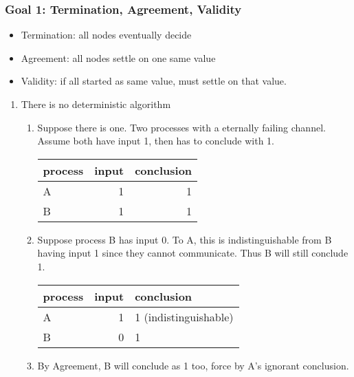 \documentclass[11pt]{article}
\begin{document}
\subsubsection{Goal 1: Termination, Agreement, Validity}
\label{sec:org74df533}
\begin{itemize}
  \item Termination: all nodes eventually decide
  \item Agreement: all nodes settle on one same value
  \item Validity: if all started as same value, must settle on that value.
\end{itemize}
\begin{enumerate}
  \item There is no deterministic algorithm
        \label{sec:org4ae2aad}
        \begin{enumerate}
          \item Suppose there is one. Two processes with a eternally failing channel. Assume
                both have input 1, then has to conclude with 1.
                \begin{center}
                  \begin{tabular}{lrr}
                    process & input & conclusion\\
                    \hline
                    A & 1 & 1\\
                    B & 1 & 1\\
                  \end{tabular}
                \end{center}
          \item Suppose process B has input 0. To A, this is indistinguishable from B having
                input 1 since they cannot communicate. Thus B will still conclude 1.
                \begin{center}
                  \begin{tabular}{lrl}
                    process & input & conclusion\\
                    \hline
                    A & 1 & 1 (indistinguishable)\\
                    B & 0 & 1\\
                  \end{tabular}
                \end{center}
          \item By Agreement, B will conclude as 1 too, force by A's ignorant conclusion.
                \begin{center}

\end{center}
\end{enumerate}
\end{enumerate}
\end{document}
